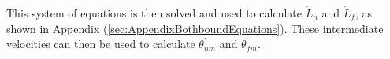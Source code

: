 \documentclass[
11pt, %
english, %
singlespacing, %
headsepline, %
chapterinoneline, %
]{MastersDoctoralThesis} %
\begin{document}
This system of equations is then solved and used to calculate $\dot{L}_n$ and $\dot{L}_f$, as shown in Appendix (\ref{sec:AppendixBothboundEquations}). These intermediate velocities can then be used to calculate $\dot{\theta_{nm}}$ and $\dot{\theta_{fm}}$.\\




\end{document}
